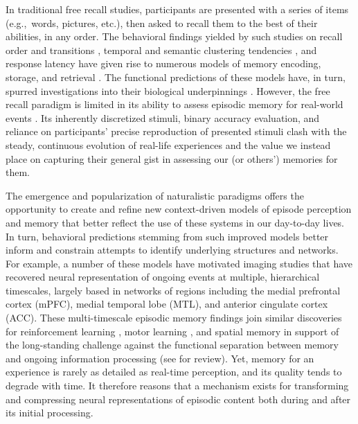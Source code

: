 \documentclass{article}
\begin{document}
In traditional free recall studies, participants are presented with a series of items (e.g.,~words, pictures, etc.), then asked to recall them to the best of their abilities, in any order. The behavioral findings yielded by such studies on recall order and transitions \citep{Murd62a, Kaha96}, temporal and semantic clustering tendencies \citep{HowaKaha02b}, and response latency \citep{MurdOkad70} have given rise to numerous models of memory encoding, storage, and retrieval \citep[e.g.,][]{AtkiShif68, HowaKaha02a, SedeEtal08, ShanEtal09, ShanHowa12}. The functional predictions of these models have, in turn, spurred investigations into their biological underpinnings \citep[e.g.,][]{PolyEtal05a, MannEtal11,MannEtal12,HowaEtal12,FolkEtal18}.  However, the free recall paradigm is limited in its ability to assess episodic memory for real-world events \citep[see][]{KoriGold94,ChenEtal17,HukEtal18,BaldEtal18,HeusEtal18c,Mann19}.  Its inherently discretized stimuli, binary accuracy evaluation, and reliance on participants' precise reproduction of presented stimuli clash with the steady, continuous evolution of real-life experiences and the value we instead place on capturing their general gist in assessing our (or others') memories for them.

The emergence and popularization of naturalistic paradigms offers the opportunity to create and refine new context-driven models of episode perception and memory that better reflect the use of these systems in our day-to-day lives. In turn, behavioral predictions stemming from such improved models better inform and constrain attempts to identify underlying structures and networks.  For example, a number of these models \citep[e.g.,][]{ChenEtal17} have motivated imaging studies that have recovered neural representation of ongoing events at multiple, hierarchical timescales, largely based in networks of regions including the medial prefrontal cortex (mPFC), medial temporal lobe (MTL), and anterior cingulate cortex (ACC).  These multi-timescale episodic memory findings join similar discoveries for reinforcement learning \citep[e.g.,][]{BernEtal11, BromEtal10c}, motor learning \citep[e.g.,][]{FusiEtal07, KimEtal15}, and spatial memory \citep[e.g.,][]{StraEtal14} in support of the long-standing challenge against the functional separation between memory and ongoing information processing (see \citealp{HassEtal15} for review).  Yet, memory for an experience is rarely as detailed as real-time perception, and its quality tends to degrade with time.  It therefore reasons that a mechanism exists for transforming and compressing neural representations of episodic content both during and after its initial processing.
\end{document}
